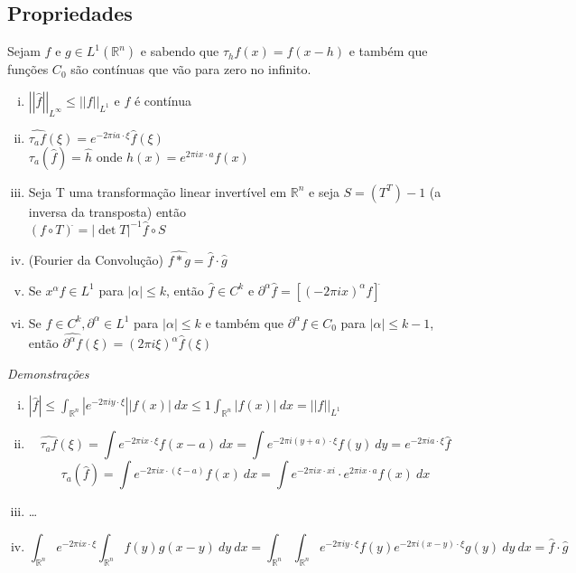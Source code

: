 \documentclass[11pt]{article}
\newcommand{\Rn}{{\mathbb{R}^n}}
\newcommand{\norm}[2]{\left|\left|#1\right|\right|_{L^{#2}}}
\begin{document}
\subsection{Propriedades}
Sejam \(f\) e \(g \in L^1(\Rn)\) e sabendo que \( \tau_h f(x) = f(x-h) \) e também que funções \(C_0\) são contínuas que vão para zero no infinito.
\begin{enumerate}[(i)]
\item \( \norm{\hat{f}}{\infty} \leq \norm{f}{1} \) e \(f\) é contínua
\item \( \widehat{\tau_a f}(\xi) = e^{-2\pi i a \cdot \xi } \hat{f}(\xi) \)\\
\( \tau_a (\hat{f}) = \hat{h}\) onde \(h(x) = e^{2\pi i x \cdot a}  f(x)  \)
\item Seja T uma transformação linear invertível em \(\Rn\) e seja \(S = (T^T)-1\) (a inversa da transposta) então\\
\( (f \circ T)^{\hat{}} = | \det T |^{-1} \hat{f} \circ S\)
\item (Fourier da Convolução) \( \widehat{f * g} = \hat{f} \cdot \hat{g} \)
\item Se \(x^\alpha f \in L^1\) para  \(|\alpha| \leq k\), então \(\hat{f}\in C^k\) e \(\partial^\alpha \hat{f} = \left[(-2\pi i x)^\alpha f\right]^{\hat{}}\)
\item Se \(f \in C^k, \partial^\alpha \in L^1\) para \(|\alpha| \leq k \) e também que \(\partial^\alpha f \in C_0\) para \(|\alpha| \leq k-1\), então \(\widehat{\partial^\alpha f}(\xi) = (2\pi i \xi)^\alpha \hat{f} (\xi)\)
\end{enumerate}

\textit{Demonstrações}
\begin{enumerate}[(i)]
	\item \( | \hat{f} | \leq \int_\Rn |e^{-2\pi i y \cdot \xi}| |f(x)|\ dx \leq 1 \int_\Rn |f(x)|\ dx = \norm{f}{1}\)
	\item \[ \widehat{\tau_a f}(\xi) =  \int e^{-2\pi i x \cdot \xi} f(x-a)\ dx =  \int e^{-2\pi i (y+a) \cdot \xi } f(y)\ dy  = e^{-2\pi i a \cdot \xi} \hat{f}\]
	\[ \tau_a (\hat{f}) = \int e^{-2\pi i x \cdot (\xi - a)} f(x)\ dx = \int e^{-2\pi i x \cdot xi} \cdot e^{2\pi i x \cdot a}f(x)\ dx\]
	\item \ldots
	\item \[\int_{\Rn} e^{-2\pi i x \cdot \xi } \int_\Rn f(y) g(x-y)\ dy \ dx = \int_\Rn \int_\Rn e^{-2\pi i y \cdot \xi }f(y) e^{-2\pi i (x-y)\cdot \xi} g(y) \ dy \ dx = \hat{f} \cdot \hat{g}\]
\end{enumerate}
\end{document}
